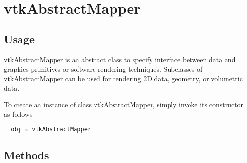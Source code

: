 \section{vtkAbstractMapper}

\subsection{Usage}

 vtkAbstractMapper is an abstract class to specify interface between data and 
 graphics primitives or software rendering techniques. Subclasses of 
 vtkAbstractMapper can be used for rendering 2D data, geometry, or volumetric
 data.


To create an instance of class vtkAbstractMapper, simply
invoke its constructor as follows
\begin{verbatim}
  obj = vtkAbstractMapper
\end{verbatim}
\subsection{Methods}

